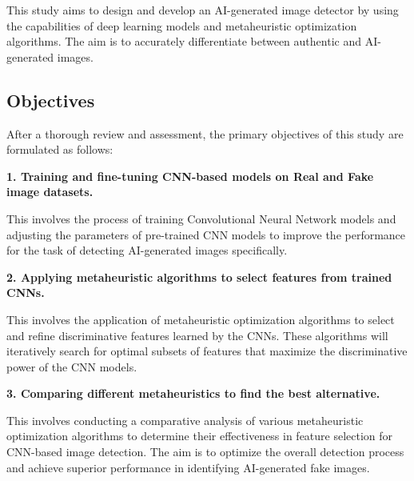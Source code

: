 This study aims to design and develop an AI-generated image detector by using the capabilities of deep learning models and metaheuristic optimization algorithms. The aim is to accurately differentiate between authentic and AI-generated images.


\subsection{Objectives}

After a thorough review and assessment, the primary objectives of this study are formulated as follows: 

\textbf{1. Training and fine-tuning CNN-based models on Real and Fake image datasets.}


This involves the process of training Convolutional Neural Network models and adjusting the parameters of pre-trained CNN models to improve the performance for the task of detecting AI-generated images specifically.




\textbf{2. Applying metaheuristic algorithms to select features from trained CNNs.}


This involves the application of metaheuristic optimization algorithms to select and refine discriminative features learned by the CNNs. These algorithms will iteratively search for optimal subsets of features that maximize the discriminative power of the CNN models.



\textbf{3. Comparing different metaheuristics to find the best alternative.}


This involves conducting a comparative analysis of various metaheuristic optimization algorithms to determine their effectiveness in feature selection for CNN-based image detection. The aim is to optimize the overall detection process and achieve superior performance in identifying AI-generated fake images.
